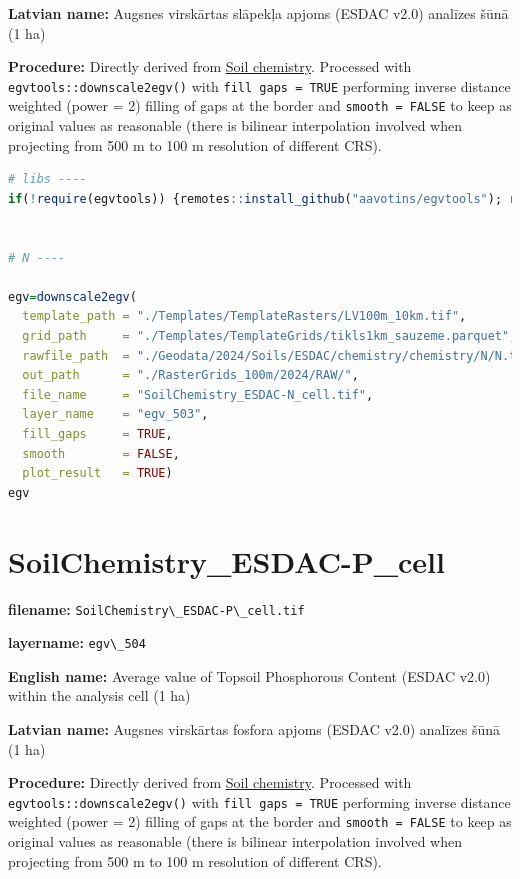 \documentclass[
]{book}
\newcommand{\passthrough}[1]{#1}
\begin{document}
\textbf{Latvian name:} Augsnes virskārtas slāpekļa apjoms (ESDAC v2.0) analīzes šūnā (1 ha)

\textbf{Procedure:} Directly derived from \hyperref[Ch04.07.01]{Soil chemistry}. Processed
with \passthrough{\lstinline!egvtools::downscale2egv()!} with \passthrough{\lstinline!fill gaps = TRUE!} performing inverse
distance weighted (power = 2) filling of gaps at the border and \passthrough{\lstinline!smooth = FALSE!}
to keep as original values as reasonable (there is bilinear interpolation
involved when projecting from 500 m to 100 m resolution of different CRS).

\begin{lstlisting}[language=R]
# libs ----
if(!require(egvtools)) {remotes::install_github("aavotins/egvtools"); require(egvtools)}


# N ----

egv=downscale2egv(
  template_path = "./Templates/TemplateRasters/LV100m_10km.tif",
  grid_path     = "./Templates/TemplateGrids/tikls1km_sauzeme.parquet",
  rawfile_path  = "./Geodata/2024/Soils/ESDAC/chemistry/chemistry/N/N.tif",
  out_path      = "./RasterGrids_100m/2024/RAW/",
  file_name     = "SoilChemistry_ESDAC-N_cell.tif",
  layer_name    = "egv_503",
  fill_gaps     = TRUE,
  smooth        = FALSE,
  plot_result   = TRUE)
egv
\end{lstlisting}

\section{SoilChemistry\_ESDAC-P\_cell}\label{ch06.504}

\textbf{filename:} \passthrough{\lstinline!SoilChemistry\_ESDAC-P\_cell.tif!}

\textbf{layername:} \passthrough{\lstinline!egv\_504!}

\textbf{English name:} Average value of Topsoil Phosphorous Content (ESDAC v2.0) within the analysis cell (1 ha)

\textbf{Latvian name:} Augsnes virskārtas fosfora apjoms (ESDAC v2.0) analīzes šūnā (1 ha)

\textbf{Procedure:} Directly derived from \hyperref[Ch04.07.01]{Soil chemistry}. Processed
with \passthrough{\lstinline!egvtools::downscale2egv()!} with \passthrough{\lstinline!fill gaps = TRUE!} performing inverse
distance weighted (power = 2) filling of gaps at the border and \passthrough{\lstinline!smooth = FALSE!}
to keep as original values as reasonable (there is bilinear interpolation
involved when projecting from 500 m to 100 m resolution of different CRS).
\end{document}
